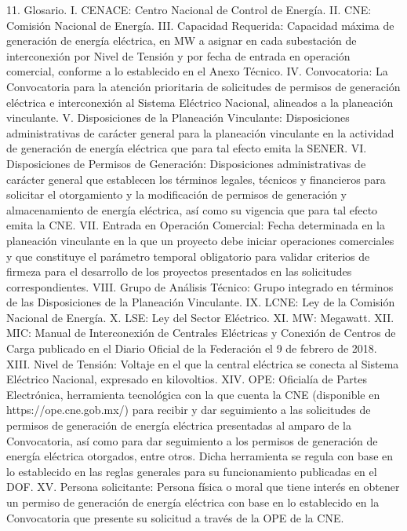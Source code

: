 11. Glosario.
I.	CENACE: Centro Nacional de Control de Energía.
II.	CNE: Comisión Nacional de Energía.
III.	Capacidad Requerida: Capacidad máxima de generación de energía eléctrica, en MW a asignar en cada subestación de interconexión por Nivel de Tensión y por fecha de entrada en operación comercial, conforme a lo establecido en el Anexo Técnico.
IV.	Convocatoria: La Convocatoria para la atención prioritaria de solicitudes de permisos de generación eléctrica e interconexión al Sistema Eléctrico Nacional, alineados a la planeación vinculante.
V.	Disposiciones de la Planeación Vinculante: Disposiciones administrativas de carácter general para la planeación vinculante en la actividad de generación de energía eléctrica que para tal efecto emita la SENER.
VI.	Disposiciones de Permisos de Generación: Disposiciones administrativas de carácter general que establecen los términos legales, técnicos y financieros para solicitar el otorgamiento y la modificación de permisos de generación y almacenamiento de energía eléctrica, así como su vigencia que para tal efecto emita la CNE.
VII.	Entrada en Operación Comercial: Fecha determinada en la planeación vinculante en la que un proyecto debe iniciar operaciones comerciales y que constituye el parámetro temporal obligatorio para validar criterios de firmeza para el desarrollo de los proyectos presentados en las solicitudes correspondientes.
VIII.	Grupo de Análisis Técnico: Grupo integrado en términos de las Disposiciones de la Planeación Vinculante.
IX.	LCNE: Ley de la Comisión Nacional de Energía.
X.	LSE: Ley del Sector Eléctrico.
XI.	MW: Megawatt.
XII.	MIC: Manual de Interconexión de Centrales Eléctricas y Conexión de Centros de Carga publicado en el Diario Oficial de la Federación el 9 de febrero de 2018.
XIII.	Nivel de Tensión: Voltaje en el que la central eléctrica se conecta al Sistema Eléctrico Nacional, expresado en kilovoltios.
XIV.	OPE: Oficialía de Partes Electrónica, herramienta tecnológica con la que cuenta la CNE (disponible en https://ope.cne.gob.mx/) para recibir y dar seguimiento a las solicitudes de permisos de generación de energía eléctrica presentadas al amparo de la Convocatoria, así como para dar seguimiento a los permisos de generación de energía eléctrica otorgados, entre otros. Dicha herramienta se regula con base en lo establecido en las reglas generales para su funcionamiento publicadas en el DOF.
XV.	Persona solicitante: Persona física o moral que tiene interés en obtener un permiso de generación de energía eléctrica con base en lo establecido en la Convocatoria que presente su solicitud a través de la OPE de la CNE.
